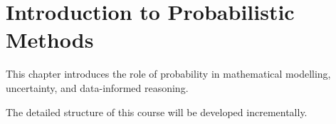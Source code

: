 \chapter{Introduction to Probabilistic Methods}

This chapter introduces the role of probability in mathematical modelling, uncertainty, and data-informed reasoning.

The detailed structure of this course will be developed incrementally.
